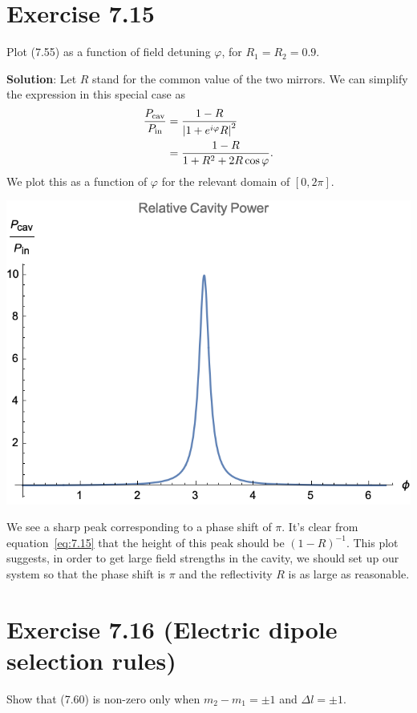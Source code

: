 \documentclass{book}
\begin{document}
\section*{Exercise 7.15}
    Plot (7.55) as a function of field detuning $\varphi$, for $R_1 = R_2 = 0.9$.

    \textbf{Solution}: Let $R$ stand for the common value of the two mirrors. We can simplify the expression in this special case as 
    \begin{align} \label{eq:7.15}
    \begin{aligned}
        \frac{P_{\rm cav}}{P_{\rm in}} &= \frac{1-R}{\abs{1 + e^{i\varphi}R}^2} \\
        &= \frac{1-R}{1 + R^2 + 2 R \cos \varphi}.
    \end{aligned}
    \end{align}
    We plot this as a function of $\varphi$ for the relevant domain of $[0,2\pi]$.
    \begin{center}
        \includegraphics{Exercise7.15.png}
    \end{center}
    We see a sharp peak corresponding to a phase shift of $\pi$. It's clear from equation~\eqref{eq:7.15} that the height of this peak should be $(1-R)^{-1}$. This plot suggests, in order to get large field strengths in the cavity, we should set up our system so that the phase shift is $\pi$ and the reflectivity $R$ is as large as reasonable.

\section{Exercise 7.16 (Electric dipole selection rules)}
    Show that (7.60) is non-zero only when $m_2 - m_1 = \pm 1$ and $\Delta l = \pm 1$.
\end{document}
